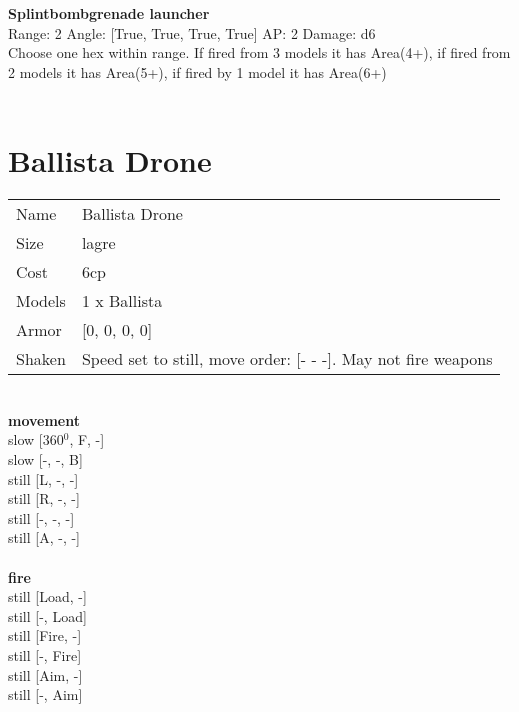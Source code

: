 \ \\

\ \\
{\bf Splintbombgrenade launcher } \\



Range: 2  Angle: [True, True, True, True] AP: 2 Damage: d6 \\
Choose one hex within range. If fired from 3 models it has Area(4+), if fired from 2 models it has Area(5+), if fired by 1 model it has Area(6+)\\ 




 
\ \\













\clearpage

\section{ Ballista Drone }

\begin{tabular}{ll}
  Name & Ballista Drone \\
  Size & lagre\\
  Cost & 6cp\\
  Models & 1 x Ballista\\
  Armor & [0, 0, 0, 0]\\
  Shaken & Speed set to still, move order: [- - -]. May not fire weapons\\
\end{tabular}

\noindent 

\ \\ {\bf movement } \\
slow [360$^0$, F, -] \\
slow [-, -, B] \\
still [L, -, -] \\
still [R, -, -] \\
still [-, -, -] \\
still [A, -, -] \\
\ \\ {\bf fire } \\
still [Load, -] \\
still [-, Load] \\
still [Fire, -] \\
still [-, Fire] \\
still [Aim, -] \\
still [-, Aim] \\


